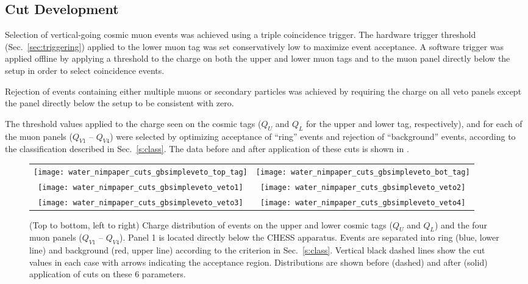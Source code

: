 \subsection{Cut Development}\label{s:cut}
Selection of vertical-going cosmic muon events was achieved using a triple coincidence trigger.  The hardware trigger threshold (Sec.~\ref{sec:triggering}) applied to the lower muon tag was set conservatively low to maximize event acceptance.  A software trigger was applied offline by applying a threshold to the charge on both the upper and lower muon tags and to the muon panel directly below the setup in order to select coincidence events.  

Rejection of events containing either multiple muons or secondary particles was achieved by requiring the charge on all veto panels except the panel directly below the setup to be consistent with zero.  

The threshold values applied to the charge seen on the cosmic tags ($Q_U$ and $Q_L$ for the upper and lower tag, respectively), and for each of the muon panels ($Q_{V1}$ -- $Q_{V4}$) were selected by optimizing acceptance of ``ring'' events and rejection of ``background'' events, according to the classification described in Sec.~\ref{s:class}.  The data before and after application of these cuts is shown in .

\begin{figure*}
\centering
\begin{tabular}{cc}
\texttt{[image: water\_nimpaper\_cuts\_gbsimpleveto\_top\_tag]} &
\texttt{[image: water\_nimpaper\_cuts\_gbsimpleveto\_bot\_tag]} \\
\texttt{[image: water\_nimpaper\_cuts\_gbsimpleveto\_veto1]} &
\texttt{[image: water\_nimpaper\_cuts\_gbsimpleveto\_veto2]} \\
\texttt{[image: water\_nimpaper\_cuts\_gbsimpleveto\_veto3]} &
\texttt{[image: water\_nimpaper\_cuts\_gbsimpleveto\_veto4]} \\
\end{tabular}
\caption{(Top to bottom, left to right) Charge distribution of events on the upper and lower cosmic tags ($Q_U$ and $Q_L$) and the four muon panels ($Q_{V1}$ -- $Q_{V4}$).  Panel 1 is located directly below the CHESS apparatus.  Events are separated into ring (blue, lower line) and background (red, upper line) according to the criterion in Sec.~\ref{s:class}.  Vertical black dashed lines show the cut values in each case with arrows indicating the acceptance region.  Distributions are shown before (dashed) and after (solid) application of cuts on these 6 parameters.}
\label{fig:event-selection-cuts}
\end{figure*}

